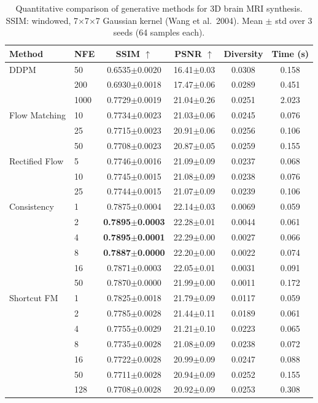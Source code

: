 \begin{table}[t]
\centering
\caption{Quantitative comparison of generative methods for 3D brain MRI synthesis.
SSIM: windowed, 7$\times$7$\times$7 Gaussian kernel (Wang et al.\ 2004).
Mean $\pm$ std over 3 seeds (64 samples each).}
\label{tab:main_results}
\begin{tabular}{llcccc}
\toprule
Method & NFE & SSIM $\uparrow$ & PSNR $\uparrow$ & Diversity & Time (s) \\
\midrule
DDPM & 50 & 0.6535$\pm$0.0020 & 16.41$\pm$0.03 & 0.0308 & 0.158 \\
 & 200 & 0.6930$\pm$0.0018 & 17.47$\pm$0.06 & 0.0289 & 0.451 \\
 & 1000 & 0.7729$\pm$0.0019 & 21.04$\pm$0.26 & 0.0251 & 2.023 \\
\midrule
Flow Matching & 10 & 0.7734$\pm$0.0023 & 21.03$\pm$0.06 & 0.0245 & 0.076 \\
 & 25 & 0.7715$\pm$0.0023 & 20.91$\pm$0.06 & 0.0256 & 0.106 \\
 & 50 & 0.7708$\pm$0.0023 & 20.87$\pm$0.05 & 0.0259 & 0.155 \\
\midrule
Rectified Flow & 5 & 0.7746$\pm$0.0016 & 21.09$\pm$0.09 & 0.0237 & 0.068 \\
 & 10 & 0.7745$\pm$0.0015 & 21.08$\pm$0.09 & 0.0238 & 0.076 \\
 & 25 & 0.7744$\pm$0.0015 & 21.07$\pm$0.09 & 0.0239 & 0.106 \\
\midrule
Consistency & 1 & 0.7875$\pm$0.0004 & 22.14$\pm$0.03 & 0.0069 & 0.059 \\
 & 2 & \textbf{0.7895$\pm$0.0003} & 22.28$\pm$0.01 & 0.0044 & 0.061 \\
 & 4 & \textbf{0.7895$\pm$0.0001} & 22.29$\pm$0.00 & 0.0027 & 0.066 \\
 & 8 & \textbf{0.7887$\pm$0.0000} & 22.20$\pm$0.00 & 0.0022 & 0.074 \\
 & 16 & 0.7871$\pm$0.0003 & 22.05$\pm$0.01 & 0.0031 & 0.091 \\
 & 50 & 0.7870$\pm$0.0000 & 21.99$\pm$0.00 & 0.0011 & 0.172 \\
\midrule
Shortcut FM & 1 & 0.7825$\pm$0.0018 & 21.79$\pm$0.09 & 0.0117 & 0.059 \\
 & 2 & 0.7785$\pm$0.0028 & 21.44$\pm$0.11 & 0.0189 & 0.061 \\
 & 4 & 0.7755$\pm$0.0029 & 21.21$\pm$0.10 & 0.0223 & 0.065 \\
 & 8 & 0.7735$\pm$0.0028 & 21.08$\pm$0.09 & 0.0238 & 0.072 \\
 & 16 & 0.7722$\pm$0.0028 & 20.99$\pm$0.09 & 0.0247 & 0.088 \\
 & 50 & 0.7711$\pm$0.0028 & 20.94$\pm$0.09 & 0.0252 & 0.155 \\
 & 128 & 0.7708$\pm$0.0028 & 20.92$\pm$0.09 & 0.0253 & 0.308 \\
\bottomrule
\end{tabular}
\end{table}